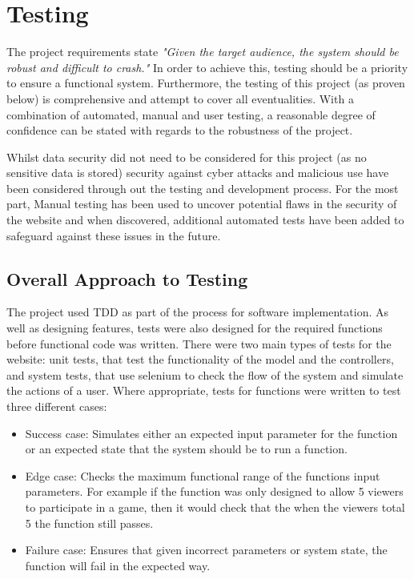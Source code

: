 \chapter{Testing}

The project requirements state \textit{"Given the target audience, the system should be robust and difficult to crash."} In order to achieve this, testing should be a priority to ensure a functional system. Furthermore, the testing of this project (as proven below) is comprehensive and attempt to cover all eventualities. With a combination of automated, manual and user testing, a reasonable degree of confidence can be stated with regards to the robustness of the project. 

Whilst data security did not need to be considered for this project (as no sensitive data is stored) security against cyber attacks and malicious use have been considered through out the testing and development process. For the most part, Manual testing has been used to uncover potential flaws in the security of the website and when discovered, additional automated tests have been added to safeguard against these issues in the future.

\section{Overall Approach to Testing}
The project used TDD as part of the process for software implementation. As well as designing features, tests were also designed for the required functions before functional code was written. There were two main types of tests for the website: unit tests, that test the functionality of the model and the controllers, and system tests, that use selenium to check the flow of the system and simulate the actions of a user. Where appropriate, tests for functions were written to test three different cases:

\begin{itemize}
\item Success case: Simulates either an expected input parameter for the function or an expected state that the system should be to run a function.

\item Edge case: Checks the maximum functional range of the functions input parameters. For example if the function was only designed to allow 5 viewers to participate in a game, then it would check that the when the viewers total 5 the function still passes.

\item Failure case: Ensures that given incorrect parameters or system state, the function will fail in the expected way.

\end{itemize}

